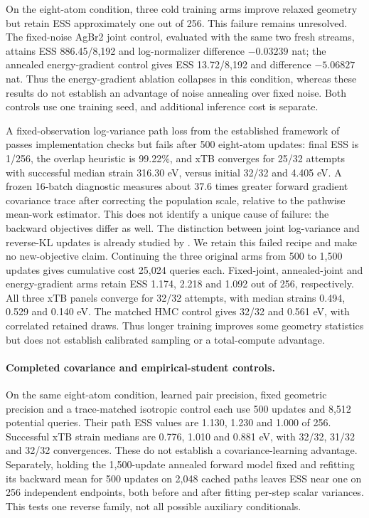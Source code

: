 On the eight-atom condition, three cold training arms improve relaxed geometry
but retain ESS approximately one out of 256. This failure remains unresolved.
The fixed-noise AgBr2 joint control, evaluated with the same two fresh streams,
attains ESS 886.45/8,192 and log-normalizer difference $-0.03239$ nat; the
annealed energy-gradient control gives ESS 13.72/8,192 and difference $-5.06827$
nat. Thus the energy-gradient ablation collapses in this condition, whereas
these results do not establish an advantage of noise annealing over fixed noise.
Both controls use one training seed, and additional inference cost is separate.

A fixed-observation log-variance path loss from the established framework of
\citet{richter2024improvedsampling} passes implementation checks but fails after
500 eight-atom updates: final ESS is 1/256, the overlap heuristic is 99.22\%,
and xTB converges for 25/32 attempts with successful median strain 316.30 eV,
versus initial 32/32 and 4.405 eV. A frozen 16-batch diagnostic measures about
37.6 times greater forward gradient covariance trace after correcting the
population scale, relative to the pathwise mean-work estimator. This does not
identify a unique cause of failure: the backward objectives differ as well.
The distinction between joint log-variance and reverse-KL updates is already
studied by \citet{sanokowski2025rethinking}. We retain this failed recipe and
make no new-objective claim. Continuing the three original arms from 500 to 1,500 updates gives cumulative
cost 25,024 queries each. Fixed-joint, annealed-joint and energy-gradient arms
retain ESS 1.174, 2.218 and 1.092 out of 256, respectively. All three xTB panels
converge for 32/32 attempts, with median strains 0.494, 0.529 and 0.140 eV.
The matched HMC control gives 32/32 and 0.561 eV, with correlated retained draws.
Thus longer training improves some geometry statistics but does not establish
calibrated sampling or a total-compute advantage.

\paragraph{Completed covariance and empirical-student controls.}
On the same eight-atom condition, learned pair precision, fixed geometric
precision and a trace-matched isotropic control each use 500 updates and
8,512 potential queries. Their path ESS values are 1.130, 1.230 and 1.000 of
256. Successful xTB strain medians are 0.776, 1.010 and 0.881 eV, with
32/32, 31/32 and 32/32 convergences. These do not establish a covariance-learning
advantage. Separately, holding the 1,500-update annealed forward model fixed
and refitting its backward mean for 500 updates on 2,048 cached paths leaves
ESS near one on 256 independent endpoints, both before and after fitting
per-step scalar variances. This tests one reverse family, not all possible
auxiliary conditionals.

